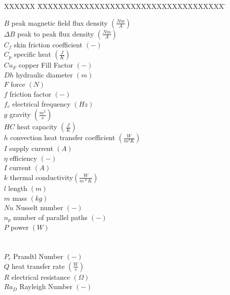 \documentclass[]{aiaa-tc}%
\begin{document}
\begin{multicols}{2}
 \begin{tabbing}
  XXXXXX \= XXXXXXXXXXXXXXXXXXXXXXXXXXXXXXXXXXXX \= \kill %
  
  $B$ \> peak magnetic field flux density $(\frac{Nm}{A})$\\
  $\Delta B$ \> peak to peak flux density $(\frac{Nm}{A})$\\
  $C_f$ \> skin friction coefficient $(-)$\\
  $C_p$ \> specific heat $(\frac{J}{K})$\\
  $Cu_F$ \> copper Fill Factor $(-)$\\
  $Dh$ \> hydraulic diameter $(m)$\\
  $F$ \> force $(N)$\\
  $f$ \> friction factor $(-)$\\
  $f_e$ \> electrical frequency $(Hz)$\\
  $g$ \> gravity $(\frac{m^{2}}{s})$\\
  $HC$ \> heat capacity $(\frac{J}{K})$\\
  $h$ \> convection heat transfer coefficient $(\frac{W}{m^{2}K})$ \\
  $I$ \> supply current $(A)$\\
  $\eta$ \> efficiency $(-)$\\
  $I$ \> current $(A)$\\
  $k$ \> thermal conductivity$(\frac{W}{m*K})$\\
  $l$ \> length $(m)$\\
  $m$ \> mass $(kg)$\\
  $Nu$ \> Nusselt number $(-)$\\
  $n_p$ \> number of parallel paths $(-)$\\
  $P$ \> power $(W)$ \\
  \\
  \\
  $P_{r}$ \> Prandtl Number $(-)$\\
  $\dot{Q}$ \> heat transfer rate $(\frac{W}{s})$ \\
  $R$ \> electrical resistance $(\Omega)$\\
  $Ra_D$ \> Rayleigh Number $(-)$\\

\end{tabbing}
\end{multicols}
\end{document}
